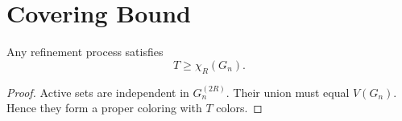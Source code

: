 \section{Covering Bound}

\begin{theorem}
Any refinement process satisfies
\[
T \ge \chi_R(G_n).
\]
\end{theorem}

\begin{proof}
Active sets are independent in $G_n^{(2R)}$. Their union must equal $V(G_n)$. Hence they form a proper coloring with $T$ colors.
\end{proof}
